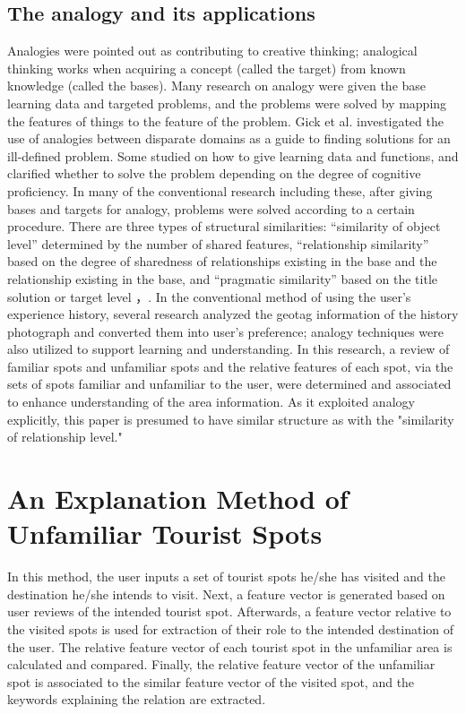 \documentclass[journal]{IAENGtran}
\begin{document}
\subsection{The analogy and its applications}
\label{subsec:The analogy and its applications}
   Analogies were pointed out as contributing to creative thinking\cite{Codd04}; analogical thinking works when acquiring a concept (called the target) from known knowledge (called the bases)\cite{Codd05}. Many research on analogy were given the base learning data and targeted problems, and the problems were solved by mapping the features of things to the feature of the problem\cite{Codd06}. Gick et al. investigated the use of analogies between disparate domains as a guide to finding solutions for an ill-defined problem. Some studied on how to give learning data and functions\cite{Codd07}, and clarified whether to solve the problem depending on the degree of cognitive proficiency\cite{Codd08}. In many of the conventional research including these, after giving bases and targets for analogy, problems were solved according to a certain procedure. There are three types of structural similarities: ``similarity of object level'' determined by the number of shared features, ``relationship similarity'' based on the degree of sharedness of relationships existing in the base and the relationship existing in the base, and ``pragmatic similarity'' based on the title solution or target level \cite{Codd05}，\cite{Codd09}.
   In the conventional method of using the user's experience history, several research analyzed the geotag information of the history photograph and converted them into user's preference; analogy techniques were also utilized to support learning and understanding. In this research, a review of familiar spots and unfamiliar spots and the relative features of each spot, via the sets of spots familiar and unfamiliar to the user, were determined and associated to enhance understanding of the area information. As it exploited analogy explicitly, this paper is presumed to have similar structure as with the "similarity of relationship level."

\section{An Explanation Method of Unfamiliar Tourist Spots}
\label{sec:An Explainaton Method of Unfamiliar Tourist Spots}

   In this method, the user inputs a set of tourist spots he/she has visited and the destination he/she intends to visit. Next, a feature vector is generated based on user reviews of the intended tourist spot. Afterwards, a feature vector relative to the visited spots is used for extraction of their role to the intended destination of the user. The relative feature vector of each tourist spot in the unfamiliar area is calculated and compared. Finally, the relative feature vector of the unfamiliar spot is associated to the similar feature vector of the visited spot, and the keywords explaining the relation are extracted.
\end{document}
